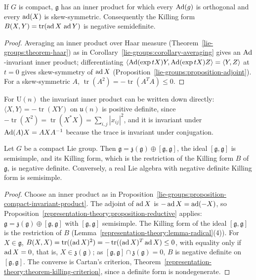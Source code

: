 \begin{proposition}\label{lie-groups:proposition-compact-invariant-product}
If $G$ is compact, $\mathfrak{g}$ has an inner product for which every $\operatorname{Ad}(g)$ is orthogonal and every $\operatorname{ad}(X)$ is skew-symmetric. Consequently the Killing form $B(X, Y) = \operatorname{tr}(\operatorname{ad} X\,\operatorname{ad} Y)$ is negative semidefinite.
\end{proposition}

\begin{proof}
Averaging an inner product over Haar measure (Theorem~\ref{lie-groups:theorem-haar}) as in Corollary~\ref{lie-groups:corollary-averaging} gives an $\operatorname{Ad}$-invariant inner product; differentiating
$\langle\operatorname{Ad}(\exp tX)Y, \operatorname{Ad}(\exp tX)Z\rangle = \langle Y, Z\rangle$ at $t = 0$ gives skew-symmetry of $\operatorname{ad} X$ (Proposition~\ref{lie-groups:proposition-adjoint}). For a skew-symmetric $A$, $\operatorname{tr}(A^2) = -\operatorname{tr}(A^TA) \leq 0$.
\end{proof}

For $\mathrm{U}(n)$ the invariant inner product can be written down directly: $\langle X, Y\rangle = -\operatorname{tr}(XY)$ on $\mathfrak{u}(n)$ is positive
definite, since $-\operatorname{tr}(X^2) = \operatorname{tr}(X^*X) = \sum_{i,j}|x_{ij}|^2$, and it is invariant under $\operatorname{Ad}(A)X = AXA^{-1}$ because the trace is
invariant under conjugation.


\begin{proposition}\label{lie-groups:proposition-compact-reductive}
Let $G$ be a compact Lie group. Then $\mathfrak{g} = \mathfrak{z}(\mathfrak{g}) \oplus [\mathfrak{g}, \mathfrak{g}]$, the ideal $[\mathfrak{g}, \mathfrak{g}]$ is semisimple, and its Killing form,
which is the restriction of the Killing form $B$ of $\mathfrak{g}$, is negative definite. Conversely, a real Lie algebra with negative definite Killing form is semisimple.
\end{proposition}

\begin{proof}
Choose an inner product as in Proposition~\ref{lie-groups:proposition-compact-invariant-product}. The adjoint of $\operatorname{ad} X$ is $-\operatorname{ad} X = \operatorname{ad}(-X)$, so
Proposition~\ref{representation-theory:proposition-reductive} applies: $\mathfrak{g} = \mathfrak{z}(\mathfrak{g}) \oplus [\mathfrak{g}, \mathfrak{g}]$ with $[\mathfrak{g}, \mathfrak{g}]$
semisimple. The Killing form of the ideal $[\mathfrak{g}, \mathfrak{g}]$ is the restriction of $B$ (Lemma~\ref{representation-theory:lemma-radical}(4)). For $X \in \mathfrak{g}$,
$B(X, X) = \operatorname{tr}((\operatorname{ad} X)^2) = -\operatorname{tr}((\operatorname{ad} X)^T\operatorname{ad} X) \leq 0$, with equality only if $\operatorname{ad} X = 0$, that is, $X \in \mathfrak{z}(\mathfrak{g})$; as
$[\mathfrak{g}, \mathfrak{g}] \cap \mathfrak{z}(\mathfrak{g}) = 0$, $B$ is negative definite on $[\mathfrak{g}, \mathfrak{g}]$. The converse is Cartan's criterion,
Theorem~\ref{representation-theory:theorem-killing-criterion}, since a definite form is nondegenerate.
\end{proof}


